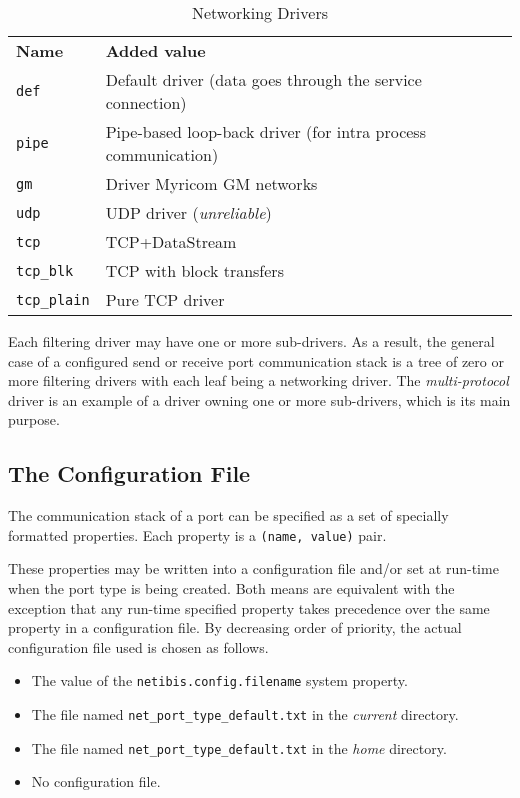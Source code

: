 \documentclass[11pt]{book}
\def\sep{\\[0.5ex]}
\begin{document}
\begin{table}[htbp]
  \centering
  \begin{tabular}{p{2cm}p{10cm}}
    \hline
    \textbf{Name}    & \textbf{Added value} \sep
    \texttt{def}        & Default driver (data goes through the service connection)\sep
    \texttt{pipe}       & Pipe-based loop-back driver (for intra process communication)\\
    \texttt{gm}         & Driver Myricom GM networks\\
    \texttt{udp}        & UDP driver (\emph{unreliable}) \sep
    \texttt{tcp}        & TCP+DataStream\\
    \texttt{tcp\_blk}   & TCP with block transfers\\
    \texttt{tcp\_plain} & Pure TCP driver\\
    \hline
  \end{tabular}
  \caption{Networking Drivers}
  \label{tab:net-drivers}
\end{table}

Each filtering driver may have one or more sub-drivers. As a result,
the general case of a configured send or receive port communication
stack is a tree of zero or more filtering drivers with each leaf being
a networking driver. The \textit{multi-protocol} driver is an example
of a driver owning one or more sub-drivers, which is its main purpose.

\subsection{The Configuration File}
\label{sec:configuration-file}

The communication stack of a port can be specified as a set of
specially formatted properties. Each property is a \texttt{(name,
  value)} pair.

These properties may be written into a configuration file and/or set
at run-time when the port type is being created. Both means are
equivalent with the exception that any run-time specified property
takes precedence over the same property in a configuration file. By
decreasing order of priority, the actual configuration file used is
chosen as follows.

\begin{itemize}
\item The value of the \texttt{netibis.config.filename} system
  property.
\item The file named \texttt{net\_port\_type\_default.txt} in the
  \emph{current} directory.
\item The file named \texttt{net\_port\_type\_default.txt} in the
  \emph{home} directory.
\item No configuration file.
\end{itemize}
\end{document}

